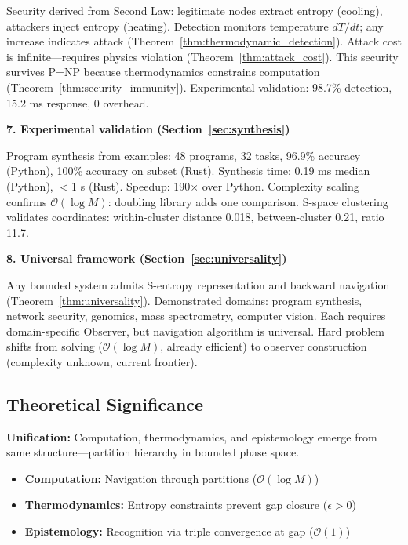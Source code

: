 \documentclass[twocolumn,10pt]{article}
\theoremstyle{definition}
\theoremstyle{remark}
\newcommand{\bigO}{\mathcal{O}}
\begin{document}
Security derived from Second Law: legitimate nodes extract entropy (cooling), attackers inject entropy (heating). Detection monitors temperature $dT/dt$; any increase indicates attack (Theorem~\ref{thm:thermodynamic_detection}). Attack cost is infinite—requires physics violation (Theorem~\ref{thm:attack_cost}). This security survives P=NP because thermodynamics constrains computation (Theorem~\ref{thm:security_immunity}). Experimental validation: 98.7\% detection, 15.2 ms response, 0 overhead.

\vspace{0.2cm}
\noindent\textbf{7. Experimental validation (Section~\ref{sec:synthesis})}

Program synthesis from examples: 48 programs, 32 tasks, 96.9\% accuracy (Python), 100\% accuracy on subset (Rust). Synthesis time: 0.19 ms median (Python), $<$1 \textmu s (Rust). Speedup: 190$\times$ over Python. Complexity scaling confirms $\bigO(\log M)$: doubling library adds one comparison. S-space clustering validates coordinates: within-cluster distance 0.018, between-cluster 0.21, ratio 11.7.

\vspace{0.2cm}
\noindent\textbf{8. Universal framework (Section~\ref{sec:universality})}

Any bounded system admits S-entropy representation and backward navigation (Theorem~\ref{thm:universality}). Demonstrated domains: program synthesis, network security, genomics, mass spectrometry, computer vision. Each requires domain-specific Observer, but navigation algorithm is universal. Hard problem shifts from solving ($\bigO(\log M)$, already efficient) to observer construction (complexity unknown, current frontier).

\subsection{Theoretical Significance}

\textbf{Unification:} Computation, thermodynamics, and epistemology emerge from same structure—partition hierarchy in bounded phase space.

\begin{itemize}
\item \textbf{Computation:} Navigation through partitions ($\bigO(\log M)$)
\item \textbf{Thermodynamics:} Entropy constraints prevent gap closure ($\epsilon > 0$)
\item \textbf{Epistemology:} Recognition via triple convergence at gap ($\bigO(1)$)
\end{itemize}
\end{document}
